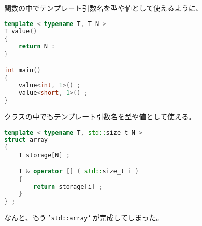 関数の中でテンプレート引数名を型や値として使えるように、
\begin{lstlisting}[language={C++}]
template < typename T, T N >
T value()
{
    return N :
}

int main()
{
    value<int, 1>() ;
    value<short, 1>() ;
}
\end{lstlisting}
クラスの中でもテンプレート引数名を型や値として使える。
\begin{lstlisting}[language={C++}]
template < typename T, std::size_t N >
struct array
{
    T storage[N] ;

    T & operator [] ( std::size_t i )
    {
        return storage[i] ;
    }
} ;
\end{lstlisting}

なんと、もう\,\texttt{'std::array'}\,が完成してしまった。
